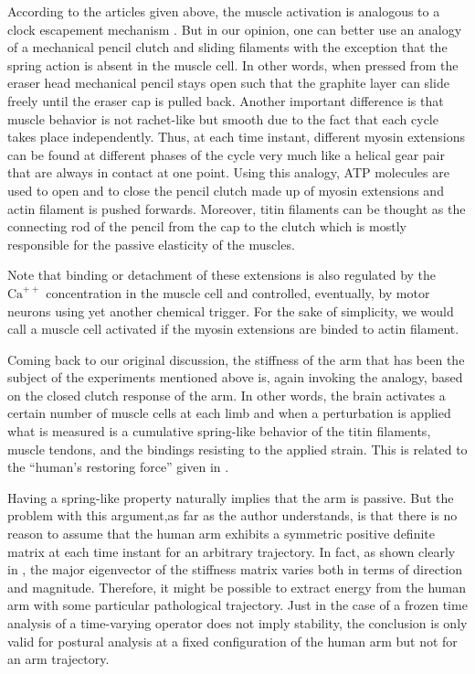 According to the articles given above, the muscle activation is analogous to a clock escapement mechanism \cite{headrick}. 
But in our opinion, one can better use an analogy of a mechanical pencil clutch and sliding filaments with the exception that the spring action 
is absent in the muscle cell. In other words, when pressed from the eraser head mechanical pencil stays open such that 
the graphite layer can slide freely until the eraser cap is pulled back. Another important difference is that muscle 
behavior is not rachet-like but smooth due to the fact that each cycle takes place independently. Thus, at each time 
instant, different myosin extensions can be found at different phases of the cycle very much like a helical gear pair 
that are always in contact at one point. Using this analogy, ATP molecules are used to open and to close the pencil clutch 
made up of myosin extensions and actin filament is pushed forwards. Moreover, titin filaments can be thought as the 
connecting rod of the pencil from the cap to the clutch which is mostly responsible for the passive elasticity of the muscles. 


Note that binding or detachment of these extensions is also regulated by the $\mathrm{Ca}^{++}$ concentration in the muscle cell 
and controlled, eventually, by motor neurons using yet another chemical trigger. For the sake of simplicity, we would call a muscle 
cell activated if the myosin extensions are binded to actin filament.


Coming back to our original discussion, the stiffness of the arm that has been the subject of the experiments mentioned 
above is, again invoking the analogy, based on the closed clutch response of the arm. In other words, the brain activates a certain
number of muscle cells at each limb and when a perturbation is applied what is measured is a cumulative spring-like behavior of the 
titin filaments, muscle tendons, and the bindings resisting to the applied strain. This is related to the \enquote{human's restoring force}
given in . 

Having a spring-like property naturally implies that the arm is passive. But the problem with this argument,as far as the author understands,
is that there is no reason to assume that the human arm exhibits a symmetric positive definite matrix at each time instant for an arbitrary trajectory. 
In fact, as shown clearly in \cite{mussa85}, the major eigenvector of the stiffness matrix varies both in terms of 
direction and magnitude. Therefore, it might be possible to extract energy from the human arm with some particular 
pathological trajectory. Just in the case of a frozen time analysis of a time-varying operator does not imply stability, the 
conclusion is only valid for postural analysis at a fixed configuration of the human arm but not for an arm trajectory. 

